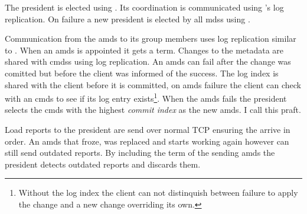 The president is elected using \raft{}. Its coordination is communicated using \raft{}'s log replication. On failure a new president is elected by all \acp{mds} using \raft{}.

Communication from the \ac{amds} to its group members uses log replication similar to \raft{}. When an \ac{amds} is appointed it gets a \raft{} term. Changes to the metadata are shared with \acp{cmds} using log replication. An \ac{amds} can fail after the change was comitted but before the client was informed of the success. The log index is shared with the client before it is committed, on \ac{amds} failure the client can check with an \ac{cmds} to see if its log entry exists\footnote{Without the log index the client can not distinquish between failure to apply the change and a new change overriding its own.}. When the \ac{amds} fails the president selects the \ac{cmds} with the highest \textsl{commit index} as the new \ac{amds}. I call this \ac{praft}.

Load reports to the president are send over normal TCP ensuring the arrive in order. An \ac{amds} that froze, was replaced and starts working again however can still send outdated reports. By including the term of the sending \ac{amds} the president detects outdated reports and discards them.
%
